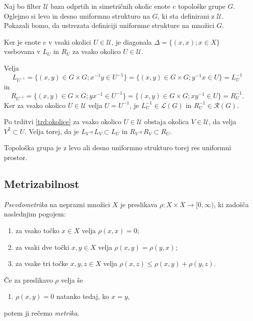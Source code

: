 \documentclass[mat1]{fmfdelo}
\newcommand{\Ucurl}{\mathcal{U}}
\begin{document}
\begin{dokaz}
Naj bo filter $\Ucurl$ baza odprtih in simetričnih okolic enote $e$ topološke grupe $G$. Oglejmo si levo in desno uniformno strukturo na $G$, ki sta definirani z $\Ucurl$. Pokazali bomo, da ustrezata definiciji uniformne strukture na množici $G$.

Ker je enote $e$ v vsaki okolici $U \in \Ucurl$, je diagonala $\Delta = \lbrace (x, x) ; x \in X \rbrace$ vsebovana v $L_U$ in $R_U$ za vsako okolico $U \in \Ucurl$.

Velja \[L_{U^{-1}} = \lbrace (x, y) \in G \times G ; x^{-1}y \in U^{-1} \rbrace = \lbrace (x, y) \in G \times G ; y^{-1}x \in U \rbrace = L^{-1}_U\]
in
\[R_{U^{-1}} = \lbrace (x, y) \in G \times G ; yx^{-1} \in U^{-1} \rbrace = \lbrace (x, y) \in G \times G ; xy^{-1} \in U \rbrace = R^{-1}_U.\]
Ker za vsako okolico $U \in \Ucurl$ velja $U = U^{-1}$, je $L^{-1}_U \in \mathcal{L}(G)$ in $R^{-1}_U \in \mathcal{R}(G)$.

Po trditvi \ref{trd:okolice} za vsako okolico $U \in \Ucurl$ obstaja okolica $V \in \Ucurl$, da velja $V^2 \subset U$. Velja torej, da je $L_V \circ L_V \subset L_U$ in $R_V \circ R_V \subset R_U$.

Topološka grupa je z levo ali desno uniformno strukturo torej res uniformni prostor.
\end{dokaz}

\subsection{Metrizabilnost}

\begin{definicija}\label{def:metrika}
	\emph{Psevdometrika} na neprazni množici $X$ je preslikava $\rho\colon X \times X \to  [0, \infty)$, ki zadošča naslednjim pogojem:
	\begin{enumerate}
		\item za vsako točko $x \in X$ velja $\rho (x, x) = 0$;
		\item za vsaki dve točki $x, y \in X$ velja $\rho (x, y) = \rho (y, x)$;
		\item za vsake tri točke $x, y, z \in X$ velja $\rho (x, z) \leq \rho (x, y) + \rho (y, z)$.
	\end{enumerate}
	Če za preslikavo $\rho$ velja še
	\begin{enumerate}[resume]
		\item $\rho(x,y) = 0$ natanko tedaj, ko $x = y$,
	\end{enumerate}
	potem ji rečemo \emph{metrika}.
\end{definicija}
\end{document}
